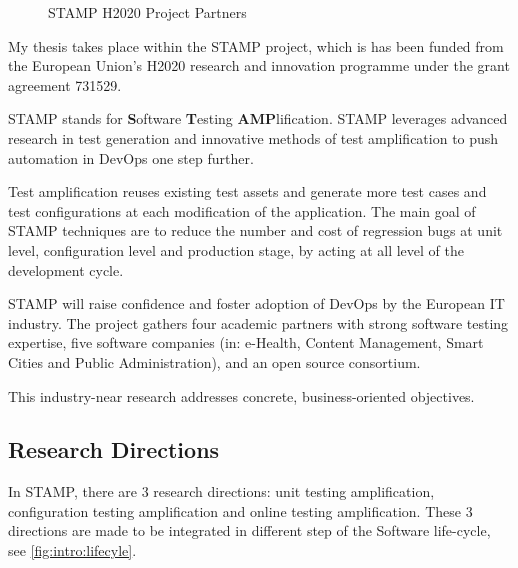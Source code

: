 \begin{figure}[h]
	\centering
	\caption{STAMP H2020 Project Partners}
	\label{fig:intro:partners-map}
\end{figure}

My thesis takes place within the STAMP project, which is has been funded from the European Union's H2020 research and innovation programme under the grant agreement 731529.

STAMP stands for \textbf{S}oftware \textbf{T}esting \textbf{AMP}lification.
STAMP leverages advanced research in test generation and innovative methods of test amplification to push automation in DevOps one step further.

Test amplification reuses existing test assets and generate more test cases and test configurations at each modification of the application.
The main goal of STAMP techniques are to reduce the number and cost of regression bugs at unit level, configuration level and production stage, by acting at all level of the development cycle.

STAMP will raise confidence and foster adoption of DevOps by the European IT industry.
The project gathers four academic partners with strong software testing expertise, five software companies (in: e-Health, Content Management, Smart Cities and Public Administration), and an open source consortium. 

This industry-near research addresses concrete, business-oriented objectives.

\subsection{Research Directions}
\label{subsec:intro:research-directions}

In STAMP, there are 3 research directions: unit testing amplification, configuration testing amplification and online testing amplification.
These 3 directions are made to be integrated in different step of the Software life-cycle, see \autoref{fig:intro:lifecyle}.


